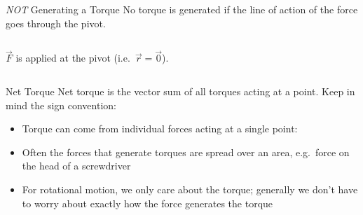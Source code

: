 \documentclass[12pt,compress,aspectratio=169]{beamer}
\begin{document}
\begin{frame}{\emph{NOT} Generating a Torque}
  No torque is generated if the line of action of the force goes through the
  pivot.
  \begin{columns}[T]
    \centering
    \vspace{.52in}

    \vspace{.03in}{\footnotesize
      Force $\vec F$ is parallel, or anti-parallel, to $\vec r$ (i.e.\
      $F_\perp=0$).\par}

    \centering

    {\footnotesize
      $\vec F$ is applied at the pivot (i.e.\ $\vec r=\vec 0$).\par
    }
  \end{columns}
\end{frame}



\begin{frame}{Net Torque}
  Net torque is the vector sum of all torques acting at a point. Keep in mind
  the sign convention:

  \begin{itemize}
  \item Torque can come from individual forces acting at a single point:


  \item\vspace{-.15in}Often the forces that generate torques are spread
    over an area, e.g.\ force on the head of a screwdriver
  \item For rotational motion, we only care about the torque; generally
    we don't have to worry about exactly how the force generates the torque
  \end{itemize}
\end{frame}
\end{document}
